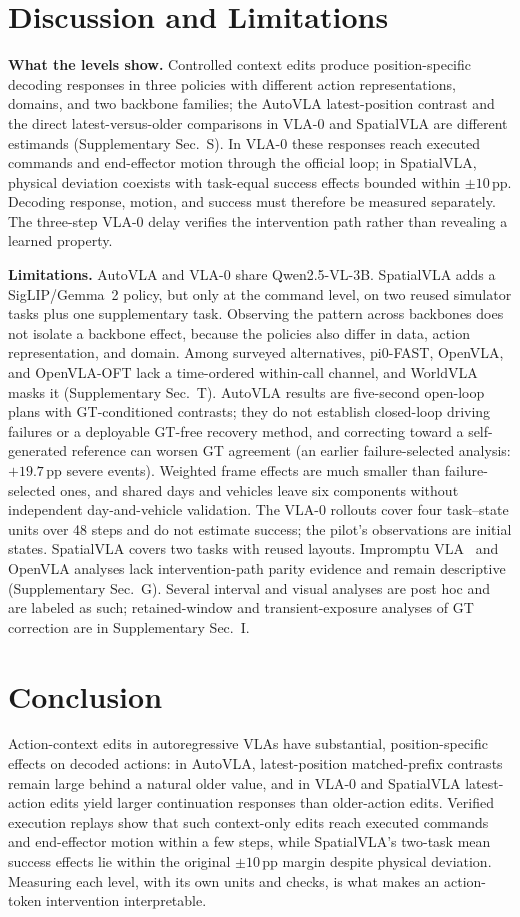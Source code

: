 \section{Discussion and Limitations}
\label{sec:limits}
\textbf{What the levels show.} Controlled context edits produce position-specific decoding responses in three policies with different action representations, domains, and two backbone families; the AutoVLA latest-position contrast and the direct latest-versus-older comparisons in VLA-0 and SpatialVLA are different estimands (Supplementary Sec.~S). In VLA-0 these responses reach executed commands and end-effector motion through the official loop; in SpatialVLA, physical deviation coexists with task-equal success effects bounded within $\pm10$\,pp. Decoding response, motion, and success must therefore be measured separately. The three-step VLA-0 delay verifies the intervention path rather than revealing a learned property.

\textbf{Limitations.} AutoVLA and VLA-0 share Qwen2.5-VL-3B. SpatialVLA adds a SigLIP/Gemma~2 policy, but only at the command level, on two reused simulator tasks plus one supplementary task. Observing the pattern across backbones does not isolate a backbone effect, because the policies also differ in data, action representation, and domain. Among surveyed alternatives, pi0-FAST, OpenVLA, and OpenVLA-OFT lack a time-ordered within-call channel, and WorldVLA masks it (Supplementary Sec.~T). AutoVLA results are five-second open-loop plans with GT-conditioned contrasts; they do not establish closed-loop driving failures or a deployable GT-free recovery method, and correcting toward a self-generated reference can worsen GT agreement (an earlier failure-selected analysis: $+19.7$\,pp severe events). Weighted frame effects are much smaller than failure-selected ones, and shared days and vehicles leave six components without independent day-and-vehicle validation. The VLA-0 rollouts cover four task--state units over 48 steps and do not estimate success; the pilot's observations are initial states. SpatialVLA covers two tasks with reused layouts. Impromptu VLA~\cite{chi2025impromptu} and OpenVLA analyses lack intervention-path parity evidence and remain descriptive (Supplementary Sec.~G). Several interval and visual analyses are post hoc and are labeled as such; retained-window and transient-exposure analyses of GT correction are in Supplementary Sec.~I.

\section{Conclusion}
Action-context edits in autoregressive VLAs have substantial, position-specific effects on decoded actions: in AutoVLA, latest-position matched-prefix contrasts remain large behind a natural older value, and in VLA-0 and SpatialVLA latest-action edits yield larger continuation responses than older-action edits. Verified execution replays show that such context-only edits reach executed commands and end-effector motion within a few steps, while SpatialVLA's two-task mean success effects lie within the original $\pm10$\,pp margin despite physical deviation. Measuring each level, with its own units and checks, is what makes an action-token intervention interpretable.
